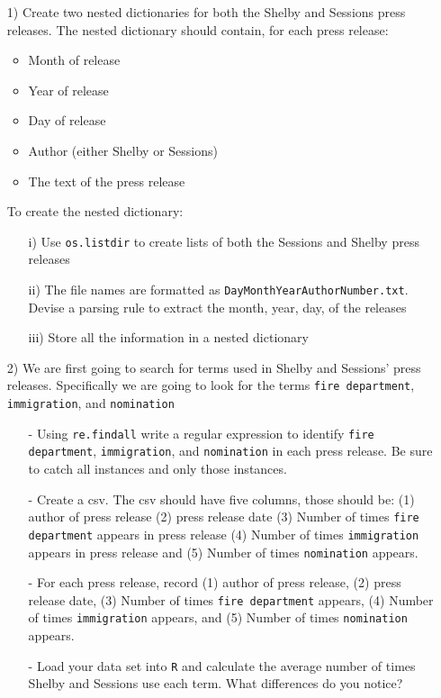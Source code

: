 \documentclass[12pt,letterpaper]{article}
\begin{document}
\begin{itemize}
\item[1)] Create two nested dictionaries for both the Shelby and Sessions press releases.  The nested dictionary should contain, for each press release:
\begin{itemize}
\item Month of release
\item Year of release
\item Day of release
\item Author (either Shelby or Sessions)
\item The text of the press release
\end{itemize}
To create the nested dictionary:
\begin{itemize}
\item[i)] Use {\tt os.listdir} to create lists of both the Sessions and Shelby press releases
\item[ii)] The file names are formatted as {\tt DayMonthYearAuthorNumber.txt}.  Devise a parsing rule to extract the month, year, day, of the releases
\item[iii)] Store all the information in a nested dictionary
\end{itemize}

\item[2)] We are first going to search for terms used in Shelby and Sessions' press releases. Specifically we are going to look for the terms {\tt fire department}, {\tt immigration}, and {\tt nomination}

\begin{itemize}
\item[-] Using {\tt re.findall} write a regular expression to identify {\tt fire department}, {\tt immigration}, and {\tt nomination} in each press release. Be sure to catch all instances and only those instances.  
\item[-] Create a csv.  The csv should have five columns, those should be: (1) author of press release (2) press release date (3) Number of times {\tt fire department} appears in press release (4) Number of times {\tt immigration} appears in press release and (5) Number of times {\tt nomination} appears.  
\item[-] For each press release, record (1) author of press release, (2) press release date, (3) Number of times {\tt fire department} appears, (4) Number of times {\tt immigration} appears, and (5) Number of times {\tt nomination} appears. 
\item[-] Load your data set into {\tt R} and calculate the average number of times Shelby and Sessions use each term.  What differences do you notice? 
\end{itemize}	



\end{itemize}
\end{document}
